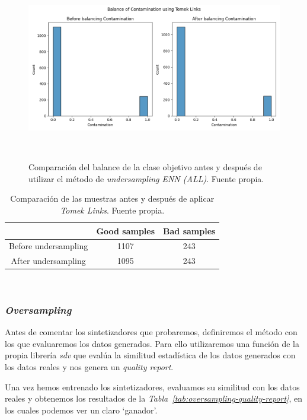 \begin{figure}[!ht]
    \centering
    \includegraphics[width=0.8\linewidth]{media/images/balance.png}
    \caption{Comparación del balance de la clase objetivo antes y después de utilizar el método de \textit{undersampling ENN (ALL)}. Fuente propia.}\ \label{fig:balance-tl}
\end{figure}

\begin{table}
    \centering
    \begin{tabular}{|c|cc|} \hline
        & Good samples & Bad samples \\ \hline
        Before undersampling & 1107 & 243 \\
        After undersampling & 1095 & 243 \\ \hline
    \end{tabular}
    \caption{Comparación de las muestras antes y después de aplicar \textit{Tomek Links}. Fuente propia.}\ \label{tab:balance-tl-comparison}
\end{table}


\clearpage

\subsubsection{\textit{Oversampling}}

Antes de comentar los sintetizadores que probaremos, definiremos el método con los que evaluaremos los datos generados. Para ello utilizaremos una función de la propia librería \textit{sdv} que evalúa la similitud estadística de los datos generados con los datos reales y nos genera un \textit{quality report}.

Una vez hemos entrenado los sintetizadores, evaluamos su similitud con los datos reales y obtenemos los resultados de la \textit{Tabla\ \ref{tab:oversampling-quality-report}}, en los cuales podemos ver un claro `ganador'.

\begin{table}[!ht]
    \centering
    \caption{Resultados del \textit{quality report} de los datos generados con los sintetizadores. Fuente propia}\ \label{tab:oversampling-quality-report}
\end{table}

